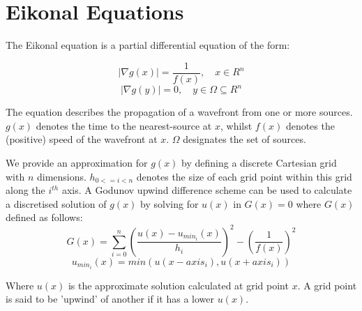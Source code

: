 \documentclass[11pt]{article}       %
\begin{document}
\section{Eikonal Equations} \label{sec:eikonal}

The Eikonal equation is a partial differential equation of the form:

\begin{equation}
|\nabla g(x)| = \frac{1}{f(x)}, \quad x \in R^n
\end{equation}
\begin{equation*}
|\nabla g(y)| = 0			  , \quad y \in \Omega \subseteq R^n
\end{equation*}

The equation describes the propagation of a wavefront from one or more sources. $g(x)$ denotes the time to the nearest-source at $x$, whilst $f(x)$ denotes the (positive) speed of the wavefront at $x$. $\Omega$ designates the set of sources.

We provide an approximation for $g(x)$ by defining a discrete Cartesian grid with $n$ dimensions. $h_{0 <= i < n}$ denotes the size of each grid point within this grid along the $i^{th}$ axis. A Godunov upwind difference scheme can be used to calculate a discretised solution of $g(x)$ by solving for $u(x)$ in $G(x) = 0$ where $G(x)$ defined as follows\cite{zhao2005fast}:
\begin{equation}\label{eq:godunov_first_order_discrete}
G(x) = \sum_{i=0}^{n}{(\frac{u(x) - u_{min_{i}}(x)}{h_i})^2} - (\frac{1}{f(x)})^2
\end{equation}
\begin{equation*}
u_{min_i}(x) = min(u(x - axis_i), u(x + axis_i))
\end{equation*}

Where $u(x)$ is the approximate solution calculated at grid point $x$. A grid point is said to be 'upwind' of another if it has a lower $u(x)$.

\end{document}
